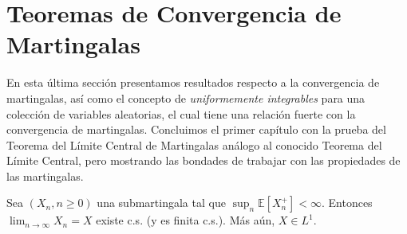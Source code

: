 \section{Teoremas de Convergencia de Martingalas}
En esta última sección presentamos resultados respecto a la convergencia de martingalas, así como el concepto de \emph{uniformemente integrables} para una colección de variables aleatorias, el cual tiene una relación fuerte con la convergencia de martingalas. Concluimos el primer capítulo con la prueba del Teorema del Límite Central de Martingalas análogo al conocido Teorema del Límite Central, pero mostrando las bondades de trabajar con las propiedades de las martingalas.

\begin{theorem}
\label{conver1}
Sea $(X_n, n \geq 0)$ una submartingala tal que $\sup_n \mathbb{E}[X_n^{+}] < \infty$. Entonces $\lim_{n \rightarrow \infty} X_n = X$ existe c.s. (y es finita c.s.). Más aún, $X \in L^1$.
\end{theorem}
